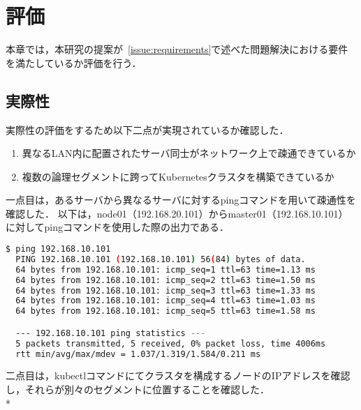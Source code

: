 \chapter{評価}
\label{evaluation}

本章では，本研究の提案が~\ref{issue:requirements}で述べた問題解決における要件を満たしているか評価を行う．

\section{実際性}
\label{evaluation:method}

実際性の評価をするため以下二点が実現されているか確認した．

\begin{enumerate}
  \item 異なるLAN内に配置されたサーバ同士がネットワーク上で疎通できているか
  \item 複数の論理セグメントに跨ってKubernetesクラスタを構築できているか
\end{enumerate}

一点目は，あるサーバから異なるサーバに対するpingコマンドを用いて疎通性を確認した．
以下は，node01（192.168.20.101）からmaster01（192.168.10.101）に対してpingコマンドを使用した際の出力である．

\begin{lstlisting}[language=bash]
  $ ping 192.168.10.101
  PING 192.168.10.101 (192.168.10.101) 56(84) bytes of data.
  64 bytes from 192.168.10.101: icmp_seq=1 ttl=63 time=1.13 ms
  64 bytes from 192.168.10.101: icmp_seq=2 ttl=63 time=1.50 ms
  64 bytes from 192.168.10.101: icmp_seq=3 ttl=63 time=1.33 ms
  64 bytes from 192.168.10.101: icmp_seq=4 ttl=63 time=1.03 ms
  64 bytes from 192.168.10.101: icmp_seq=5 ttl=63 time=1.58 ms

  --- 192.168.10.101 ping statistics ---
  5 packets transmitted, 5 received, 0% packet loss, time 4006ms
  rtt min/avg/max/mdev = 1.037/1.319/1.584/0.211 ms
\end{lstlisting}

二点目は，kubectlコマンドにてクラスタを構成するノードのIPアドレスを確認し，それらが別々のセグメントに位置することを確認した．\\*

